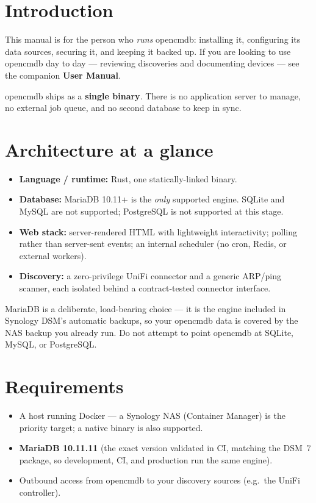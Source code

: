 \documentclass[11pt,oneside,listof=totoc,bibliography=totoc]{scrreprt}
\begin{document}

\tableofcontents

\chapter{Introduction}
This manual is for the person who \emph{runs} opencmdb: installing it, configuring its data
sources, securing it, and keeping it backed up. If you are looking to use opencmdb day to
day — reviewing discoveries and documenting devices — see the companion \textbf{User Manual}.

\begin{note}
opencmdb ships as a \textbf{single binary}. There is no application server to manage, no
external job queue, and no second database to keep in sync.
\end{note}

\chapter{Architecture at a glance}
\begin{itemize}
  \item \textbf{Language / runtime:} Rust, one statically-linked binary.
  \item \textbf{Database:} MariaDB 10.11+ is the \emph{only} supported engine. SQLite and
        MySQL are not supported; PostgreSQL is not supported at this stage.
  \item \textbf{Web stack:} server-rendered HTML with lightweight interactivity; polling
        rather than server-sent events; an internal scheduler (no cron, Redis, or external
        workers).
  \item \textbf{Discovery:} a zero-privilege UniFi connector and a generic ARP/ping scanner,
        each isolated behind a contract-tested connector interface.
\end{itemize}

\begin{warning}
MariaDB is a deliberate, load-bearing choice — it is the engine included in Synology DSM's
automatic backups, so your opencmdb data is covered by the NAS backup you already run. Do
not attempt to point opencmdb at SQLite, MySQL, or PostgreSQL.
\end{warning}

\chapter{Requirements}
\begin{itemize}
  \item A host running Docker — a Synology NAS (Container Manager) is the priority target; a
        native binary is also supported.
  \item \textbf{MariaDB 10.11.11} (the exact version validated in CI, matching the DSM~7
        package, so development, CI, and production run the same engine).
  \item Outbound access from opencmdb to your discovery sources (e.g.\ the UniFi controller).
\end{itemize}
\end{document}
